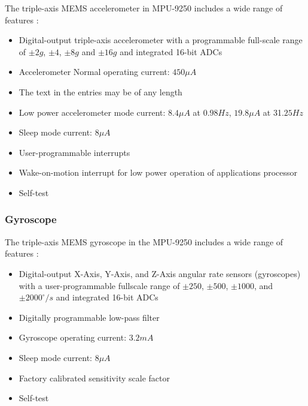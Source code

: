 The triple-axis MEMS accelerometer in MPU-9250 includes a wide range of features \cite{mpu9250specification}:

\begin{itemize}
  \item Digital-output triple-axis accelerometer with a programmable full-scale range  of $\pm 2g$, $\pm 4$, $\pm 8g$ and $\pm 16g$ and integrated 16-bit ADCs
  \item Accelerometer Normal operating current: $450 \mu A$
  \item The text in the entries may be of any length
  \item Low power accelerometer mode current: $8.4 \mu A$ at $0.98Hz$, $19.8 \mu A$ at 31.$25Hz$
  \item Sleep mode current: $8 \mu A$
  \item User-programmable interrupts
  \item Wake-on-motion interrupt for low power operation of applications processor
  \item Self-test
\end{itemize}

\begin{figure}[H]
  \centering
  
\end{figure}

\subsubsection{Gyroscope}

The triple-axis MEMS gyroscope in the MPU-9250 includes a wide range of features \cite{mpu9250specification}:

\begin{itemize}
  \item Digital-output X-Axis, Y-Axis, and Z-Axis angular rate sensors (gyroscopes) with a user-programmable fullscale range of $\pm 250$, $\pm 500$, $\pm 1000$, and $\pm 2000^{\circ}/s$ and integrated 16-bit ADCs
  \item Digitally programmable low-pass filter
  \item Gyroscope operating current: $3.2mA$
  \item Sleep mode current: $8 \mu A$
  \item Factory calibrated sensitivity scale factor
  \item Self-test
\end{itemize}

\begin{figure}[H]
  \centering
  
\end{figure}

